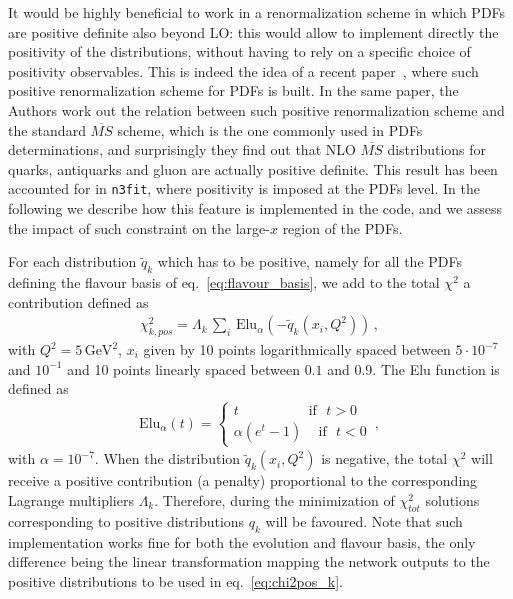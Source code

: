 %
It would be highly beneficial to work in a renormalization scheme in which PDFs are positive definite
also beyond LO: this would allow to implement directly the positivity of the distributions,
without having to rely on a specific choice of positivity observables.
This is indeed the idea of a recent paper~\cite{Candido:2020yat}, where such positive renormalization
scheme for PDFs is built. In the same paper, the Authors work out the relation between such positive
renormalization scheme and the standard $\overline{MS}$ scheme, which is the one commonly used in 
PDFs determinations, and surprisingly they find out that NLO $\overline{MS}$ distributions
for quarks, antiquarks and gluon are actually positive definite.  
This result has been accounted for in {\tt n3fit}, where positivity is imposed at the PDFs level.
In the following we describe how this feature is implemented in the code, and we assess the impact of such constraint
on the large-$x$ region of the PDFs.

%
For each distribution $\tilde{q}_k$ which has to be positive, namely for all the PDFs defining the
flavour basis of eq.~\eqref{eq:flavour_basis}, we add to the total $\chi^2$ a contribution defined as  
\begin{align}
	\label{eq:chi2pos_k}
	\chi^2_{k,pos} = \Lambda_k \,\sum_i \,\text{Elu}_{\alpha}\left(-\tilde{q}_k\left(x_i,Q^2\right)\right)\,,
\end{align}
with $Q^2 = 5\, \text{GeV}^2$, $x_i$ given by 10 points logarithmically spaced between $5\cdot10^{-7}$ and $10^{-1}$ and 10 points
linearly spaced between $0.1$ and $0.9$. The Elu function is defined as 
\begin{align}
	\label{eq:Elu}
	\text{Elu}_{\alpha}\left(t\right) = 
	\begin{cases}
		t \,\,\,\,\,\,\,\,\,\,\,\,\,\,\,\,\,\,\,\,\,\,\,\,\,\,\,\,\,\,\text{if}\,\,\,\, t>0 \\
		\alpha\left(e^t-1\right)\,\,\,\,\,\,\,\text{if}\,\,\,\, t<0
	\end{cases}\,,
\end{align} 
with $\alpha=10^{-7}$. 
When the distribution $\tilde{q}_k\left(x_i, Q^2\right)$ is negative, the total $\chi^2$ will receive a positive contribution
(a penalty) proportional to the corresponding Lagrange multipliers $\Lambda_k$. 
Therefore, during the minimization of $\chi^2_{tot}$ solutions corresponding to positive distributions $q_k$
will be favoured. Note that such implementation works fine for both the evolution and flavour basis, the only 
difference being the linear transformation mapping the network outputs to the positive distributions to be 
used in eq.~\eqref{eq:chi2pos_k}.

